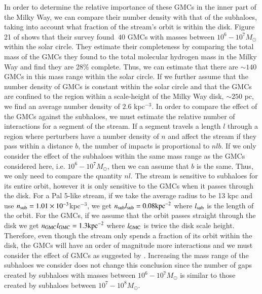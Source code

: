 \documentclass[useAMS,usenatbib]{mn2e}
\begin{document}
In order to determine the relative importance of these GMCs in the inner part of the Milky Way, we can compare their number density with that of the subhaloes, taking into account what fraction of the stream's orbit is within the disk. Figure 21 of \cite{rice_et_al_2016} shows that their survey found $~40$ GMCs with masses between $10^6-10^7 M_\odot$ within the solar circle. They estimate their completeness by comparing  the total mass of the GMCs they found to the total molecular hydrogen mass in the Milky Way and find they are 28\% complete. Thus, we can estimate that there are $\sim 140$ GMCs in this mass range within the solar circle. If we further assume that the number density of GMCs is constant within the solar circle and that the GMCs are confined to the region within a scale-height of the Milky Way disk, $\sim 250$ pc, we find an average number density of $2.6$ kpc$^{-3}$. In order to compare the effect of the GMCs against the subhaloes, we must estimate the relative number of interactions for a segment of the stream. If a segment travels a length $l$ through a region where perturbers have a number density of $n$ and affect the stream if they pass within a distance $b$, the number of impacts is proportional to $n l b$. If we only consider the effect of the subhaloes within the same mass range as the GMCs considered here, i.e. $10^6-10^7 M_\odot$, then we can assume that $b$ is the same. Thus, we only need to compare the quantity $nl$. The stream is sensitive to subhaloes for its entire orbit, however it is only sensitive to the GMCs when it passes through the disk. For a Pal 5-like stream, if we take the average radius to be 13 kpc and use $n_{\rm sub} = 1.01\times 10^{-3}$kpc$^{-3}$, we get $n_{\rm sub}l_{\rm sub} = 0.08{\rm kpc}^{-2}$ where $l_{\rm sub}$ is the length of the orbit. For the GMCs, if we assume that the orbit passes straight through the disk we get $n_{\rm GMC}l_{\rm GMC} = 1.3{\rm kpc}^{-2}$ where $l_{\rm GMC}$ is twice the disk scale height. Therefore, even though the stream only spends a fraction of its orbit within the disk, the GMCs will have an order of magnitude more interactions and we must consider the effect of GMCs as suggested by \cite{amorisco_gmcs}. Increasing the mass range of the subhaloes we consider does not change this conclusion since the number of gaps created by subhaloes with masses between $10^6-10^7 M_\odot$ is similar to those created by subhaloes between $10^7-10^8 M_\odot$.
\end{document}

